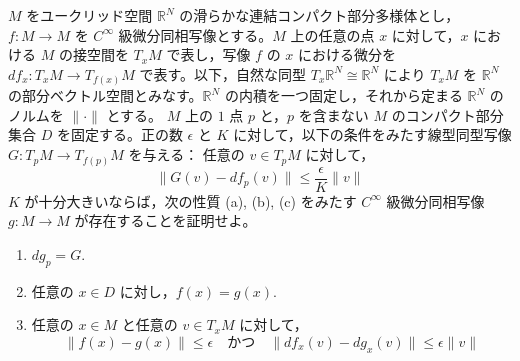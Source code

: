 \documentclass[12pt]{jlreq}
\newcommand{\R}{\mathbb{R}}
\begin{document}
$M$ をユークリッド空間 $\R^N$ の滑らかな連結コンパクト部分多様体とし，$f : M \to M$ を $C^\infty$ 級微分同相写像とする。$M$ 上の任意の点 $x$ に対して，$x$ における $M$ の接空間を $T_xM$ で表し，写像 $f$ の $x$ における微分を $df_x : T_xM \to T_{f(x)}M$ で表す。以下，自然な同型 $T_x\R^N \cong \R^N$ により $T_xM$ を $\R^N$ の部分ベクトル空間とみなす。$\R^N$ の内積を一つ固定し，それから定まる $\R^N$ のノルムを $\|\cdot\|$ とする。
$M$ 上の $1$ 点 $p$ と，$p$ を含まない $M$ のコンパクト部分集合 $D$ を固定する。正の数 $\epsilon$ と $K$ に対して，以下の条件をみたす線型同型写像 $G : T_pM \to T_{f(p)}M$ を与える：
任意の $v \in T_pM$ に対して，
\[
  \|G(v) - df_p(v)\| \le \frac{\epsilon}{K} \|v\|
\]
$K$ が十分大きいならば，次の性質 (a), (b), (c) をみたす $C^\infty$ 級微分同相写像 $g : M \to M$ が存在することを証明せよ。
\begin{enumerate}
  \item[(a)] $dg_p = G$.
  \item[(b)] 任意の $x \in D$ に対し，$f(x) = g(x)$.
  \item[(c)] 任意の $x \in M$ と任意の $v \in T_xM$ に対して，
  \[
    \|f(x) - g(x)\| \le \epsilon \quad \text{かつ} \quad \|df_x(v) - dg_x(v)\| \le \epsilon \|v\|
  \]
\end{enumerate}
\end{document}
